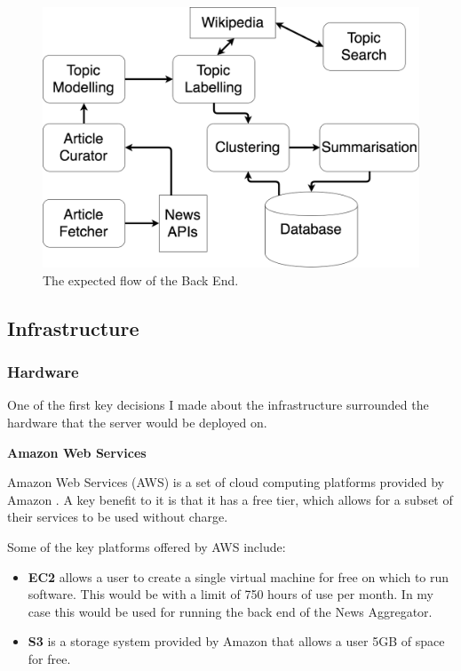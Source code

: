 \documentclass[12pt]{article}
\begin{document}
\begin{figure}[ht!]
  \centering
    \includegraphics[scale=0.4]{BackEndArchitecture.png}
   \caption[A guide to the expected flow of the Back End]{The expected flow of the Back End.}
   \label{backEndArchitecture}
\end{figure}

\subsection{Infrastructure}

\subsubsection{Hardware}

One of the first key decisions I made about the infrastructure surrounded the hardware that the server would be deployed on.

\textbf{Amazon Web Services}

Amazon Web Services (AWS) \cite{aws} is a set of cloud computing platforms provided by Amazon \cite{amazon}. A key benefit to it is that it has a free tier, which allows for a subset of their services to be used without charge.

Some of the key platforms offered by AWS include: \\

\begin{itemize}
	\item \textbf{EC2} \cite{ec2} allows a user to create a single virtual machine for free on which to run software. This would be with a limit of 750 hours of use per month. In my case this would be used for running the back end of the News Aggregator. 
	\item \textbf{S3} \cite{s3} is a storage system provided by Amazon that allows a user 5GB of space for free. \\
\end{itemize} 
\end{document}
